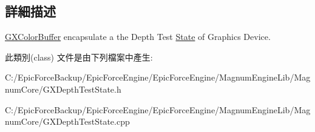 \subsection{詳細描述}
\hyperlink{class_magnum_1_1_g_x_color_buffer}{G\+X\+Color\+Buffer} encapsulate a the Depth Test \hyperlink{class_magnum_1_1_state}{State} of Graphics Device. 

此類別(class) 文件是由下列檔案中產生\+:\begin{DoxyCompactItemize}
\item 
C\+:/\+Epic\+Force\+Backup/\+Epic\+Force\+Engine/\+Epic\+Force\+Engine/\+Magnum\+Engine\+Lib/\+Magnum\+Core/G\+X\+Depth\+Test\+State.\+h\item 
C\+:/\+Epic\+Force\+Backup/\+Epic\+Force\+Engine/\+Epic\+Force\+Engine/\+Magnum\+Engine\+Lib/\+Magnum\+Core/G\+X\+Depth\+Test\+State.\+cpp\end{DoxyCompactItemize}
